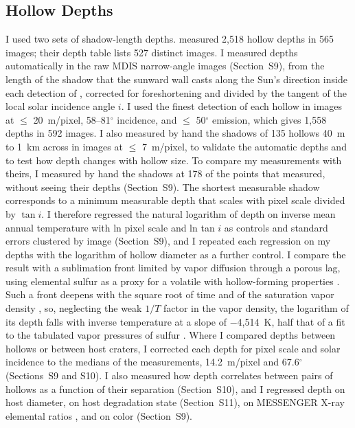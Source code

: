 \documentclass[article,review]{planetary}
\begin{document}
\subsection{Hollow Depths}
\label{sec:depthmethods}
I used two sets of shadow-length depths. \textcite{blewett2016} measured 2,518 hollow depths in 565 images; their depth table lists 527 distinct images. I measured depths automatically in the raw MDIS narrow-angle images (Section~S9), from the length of the shadow that the sunward wall casts along the Sun's direction inside each detection of \textcite{bickel2025}, corrected for foreshortening and divided by the tangent of the local solar incidence angle $i$. I used the finest detection of each hollow in images at $\leq$ 20~m/pixel, 58--81$^\circ$ incidence, and $\leq$ 50$^\circ$ emission, which gives 1,558 depths in 592 images. I also measured by hand the shadows of 135 hollows 40~m to 1~km across in images at $\leq$ 7~m/pixel, to validate the automatic depths and to test how depth changes with hollow size. To compare my measurements with theirs, I measured by hand the shadows at 178 of the points that \textcite{blewett2016} measured, without seeing their depths (Section~S9). The shortest measurable shadow corresponds to a minimum measurable depth that scales with pixel scale divided by $\tan i$. I therefore regressed the natural logarithm of depth on inverse mean annual temperature with ln pixel scale and ln tan $i$ as controls and standard errors clustered by image (Section~S9), and I repeated each regression on my depths with the logarithm of hollow diameter as a further control. I compare the result with a sublimation front limited by vapor diffusion through a porous lag, using elemental sulfur as a proxy for a volatile with hollow-forming properties \parencite{phillips2021}. Such a front deepens with the square root of time and of the saturation vapor density \parencite{schorghofer2018}, so, neglecting the weak $1/T$ factor in the vapor density, the logarithm of its depth falls with inverse temperature at a slope of $-$4,514~K, half that of a fit to the tabulated vapor pressures of sulfur \parencite{lide2007}. Where I compared depths between hollows or between host craters, I corrected each depth for pixel scale and solar incidence to the medians of the measurements, 14.2~m/pixel and 67.6$^\circ$ (Sections~S9 and S10). I also measured how depth correlates between pairs of hollows as a function of their separation (Section~S10), and I regressed depth on host diameter, on host degradation state (Section~S11), on MESSENGER X-ray elemental ratios \parencite[Section~S9;][]{nittler2020}, and on color (Section~S9).
\end{document}
